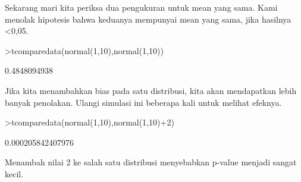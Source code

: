 \documentclass{article}
\begin{document}
\begin{eulernotebook}
\begin{eulercomment}
\begin{eulercomment}
\begin{eulercomment}
Sekarang mari kita periksa dua pengukuran untuk mean yang sama. Kami
menolak hipotesis bahwa keduanya mempunyai mean yang sama, jika
hasilnya \textless{}0,05.
\end{eulercomment}
\begin{eulerprompt}
>tcomparedata(normal(1,10),normal(1,10))
\end{eulerprompt}
\begin{euleroutput}
  0.4848094938
\end{euleroutput}
\begin{eulercomment}
Jika kita menambahkan bias pada satu distribusi, kita akan mendapatkan
lebih banyak penolakan. Ulangi simulasi ini beberapa kali untuk
melihat efeknya.
\end{eulercomment}
\begin{eulerprompt}
>tcomparedata(normal(1,10),normal(1,10)+2)
\end{eulerprompt}
\begin{euleroutput}
  0.000205842407976
\end{euleroutput}
\begin{eulercomment}
Menambah nilai 2 ke salah satu distribusi menyebabkan p-value menjadi
sangat kecil.


\end{eulercomment}
\end{eulercomment}
\end{eulercomment}
\end{eulernotebook}
\end{document}
